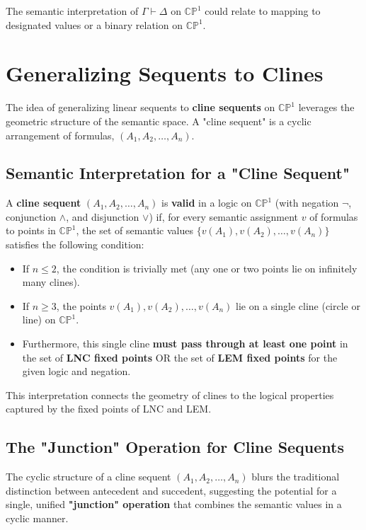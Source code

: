 \documentclass{article}
\begin{document}
	The semantic interpretation of $\Gamma \vdash \Delta$ on $\mathbb{CP}^1$ could relate to mapping to designated values or a binary relation on $\mathbb{CP}^1$.
	
	\section{Generalizing Sequents to Clines}
	
	The idea of generalizing linear sequents to \textbf{cline sequents} on $\mathbb{CP}^1$ leverages the geometric structure of the semantic space. A "cline sequent" is a cyclic arrangement of formulas, $(A_1, A_2, \dots, A_n)$.
	
	\subsection{Semantic Interpretation for a "Cline Sequent"}
	
	A \textbf{cline sequent} $(A_1, A_2, \dots, A_n)$ is \textbf{valid} in a logic on $\mathbb{CP}^1$ (with negation $\neg$, conjunction $\wedge$, and disjunction $\vee$) if, for every semantic assignment $v$ of formulas to points in $\mathbb{CP}^1$, the set of semantic values $\{v(A_1), v(A_2), \dots, v(A_n)\}$ satisfies the following condition:
	
	\begin{itemize}
		\item If $n \le 2$, the condition is trivially met (any one or two points lie on infinitely many clines).
		
		\item If $n \ge 3$, the points $v(A_1), v(A_2), \dots, v(A_n)$ lie on a single cline (circle or line) on $\mathbb{CP}^1$.
		
		\item Furthermore, this single cline \textbf{must pass through at least one point} in the set of \textbf{LNC fixed points} OR the set of \textbf{LEM fixed points} for the given logic and negation.
	\end{itemize}
	This interpretation connects the geometry of clines to the logical properties captured by the fixed points of LNC and LEM.
	
	\subsection{The "Junction" Operation for Cline Sequents}
	
	The cyclic structure of a cline sequent $(A_1, A_2, \dots, A_n)$ blurs the traditional distinction between antecedent and succedent, suggesting the potential for a single, unified \textbf{"junction" operation} that combines the semantic values in a cyclic manner.
	
\end{document}
